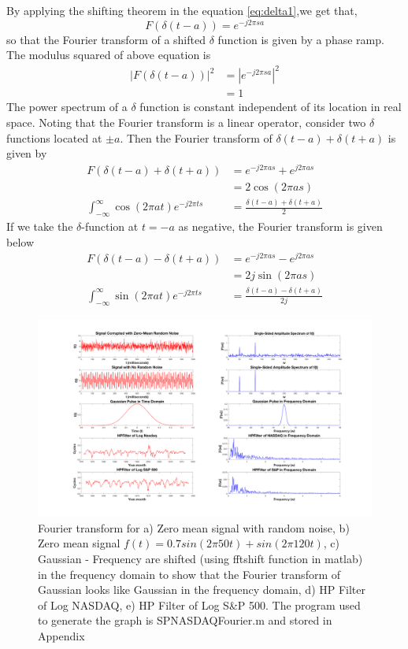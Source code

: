 By applying the shifting theorem in the equation \ref{eq:delta1},we get that, 
\begin{equation}
F(\delta(t-a)) = e^{-j2\pi s a}
\end{equation}
so that the Fourier transform of a shifted $\delta$ function is given by a phase ramp. The modulus squared of above equation is
\begin{equation}
\begin{split}
|F(\delta(t-a))|^2 & = |e^{-j2\pi s a}|^2 \\
& = 1
\end{split}
\end{equation}
The power spectrum of a $\delta$ function is constant independent of its location in real space. Noting that the Fourier transform is a linear operator, consider two $\delta$ functions located at $\pm a$. Then the Fourier transform of $\delta(t-a)+\delta(t+a)$ is given by
\begin{equation}
\begin{split}
F(\delta(t-a)+\delta(t+a)) & = e^{-j2\pi as}+e^{j2\pi as}\\
& = 2\cos(2 \pi as) \\
\int_{-\infty}^{\infty} \cos(2 \pi a t) e^{-j2\pi t s} &= \frac{\delta(t-a)+\delta(t+a)}{2}
\end{split}
\end{equation}
If we take the $\delta$-function at $t=-a$ as negative, the Fourier transform is given below
\begin{equation}
\begin{split}
F(\delta(t-a)-\delta(t+a)) & = e^{-j2\pi as}-e^{j2\pi as}\\
& = 2j\sin(2 \pi as) \\
\int_{-\infty}^{\infty} \sin(2 \pi a t) e^{-j2\pi t s} &= \frac{\delta(t-a)-\delta(t+a)}{2j}
\end{split}
\end{equation}
\begin{figure}[!ht]
\includegraphics[scale=.15]{Images/fourier3}
\caption{Fourier transform for a) Zero mean signal with random noise, b) Zero mean signal $f(t) = 0.7sin(2\pi 50t)+sin(2\pi 120t)$, c) Gaussian - Frequency are shifted (using fftshift function in matlab) in the frequency domain to show that the Fourier transform of Gaussian looks like Gaussian in the frequency domain, d) HP Filter of Log NASDAQ, e) HP Filter of Log S\&P 500. The program used to generate the graph is SPNASDAQFourier.m and stored in Appendix }
\label{fig:Fourier3}
\end{figure}
